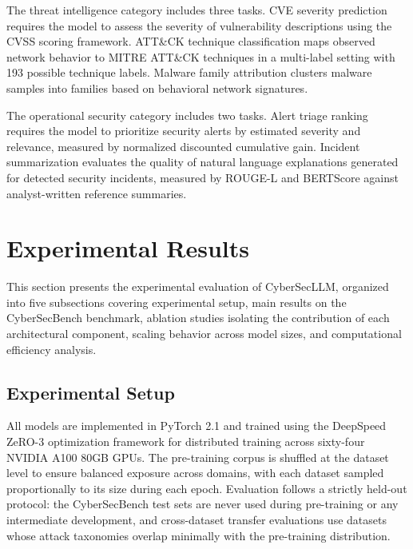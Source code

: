 \documentclass[journal]{IEEEtran}
\newcommand{\modelname}{CyberSecLLM}
\newcommand{\benchname}{CyberSecBench}
\begin{document}
The threat intelligence category includes three tasks. CVE severity prediction requires the model to assess the severity of vulnerability descriptions using the CVSS scoring framework. ATT\&CK technique classification maps observed network behavior to MITRE ATT\&CK techniques in a multi-label setting with 193 possible technique labels. Malware family attribution clusters malware samples into families based on behavioral network signatures.

The operational security category includes two tasks. Alert triage ranking requires the model to prioritize security alerts by estimated severity and relevance, measured by normalized discounted cumulative gain. Incident summarization evaluates the quality of natural language explanations generated for detected security incidents, measured by ROUGE-L and BERTScore against analyst-written reference summaries.

\section{Experimental Results}
\label{sec:experiments}

This section presents the experimental evaluation of \modelname{}, organized into five subsections covering experimental setup, main results on the \benchname{} benchmark, ablation studies isolating the contribution of each architectural component, scaling behavior across model sizes, and computational efficiency analysis.

\subsection{Experimental Setup}
\label{subsec:setup}

All models are implemented in PyTorch 2.1 and trained using the DeepSpeed ZeRO-3 optimization framework for distributed training across sixty-four NVIDIA A100 80GB GPUs. The pre-training corpus is shuffled at the dataset level to ensure balanced exposure across domains, with each dataset sampled proportionally to its size during each epoch. Evaluation follows a strictly held-out protocol: the CyberSecBench test sets are never used during pre-training or any intermediate development, and cross-dataset transfer evaluations use datasets whose attack taxonomies overlap minimally with the pre-training distribution.
\end{document}
